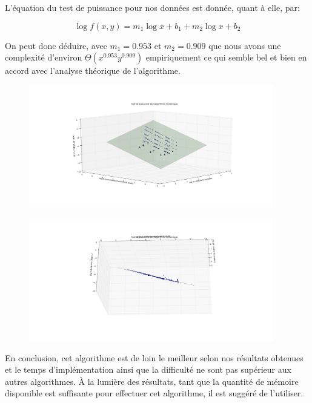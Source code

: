 \documentclass[a4paper, 12pt]{article} %
\begin{document}
    L'équation du test de puissance pour nos données est donnée, quant à elle, par:

    \begin{equation}
        \log f(x,y) = m_{1}\log x + b_{1} + m_{2}\log x + b_{2}
    \end{equation}

    On peut donc déduire, avec $m_{1} = 0.953$ et $m_{2} = 0.909$ que nous avons une complexité
    d'environ $\Theta(x^{0.953}y^{0.909})$ empiriquement ce qui semble bel et bien en accord 
    avec l'analyse théorique de l'algorithme.

    \begin{figure}
    	\centering
        \includegraphics[width=0.95\textwidth]{Figure/AlgorithmeDynamique.png}
    \end{figure}

    \begin{figure}
    	\centering
        \includegraphics[width=0.95\textwidth]{Figure/AlgorithmeDynamique2.png}
    \end{figure}

    \vspace{12pt}
    En conclusion, cet algorithme est de loin le meilleur selon nos résultats obtenues et le temps
    d'implémentation ainsi que la difficulté ne sont pas supérieur aux autres algorithmes. À la lumière
    des résultats, tant que la quantité de mémoire disponible est suffisante pour effectuer cet algorithme, 
    il est suggéré de l'utiliser.


\end{document}
